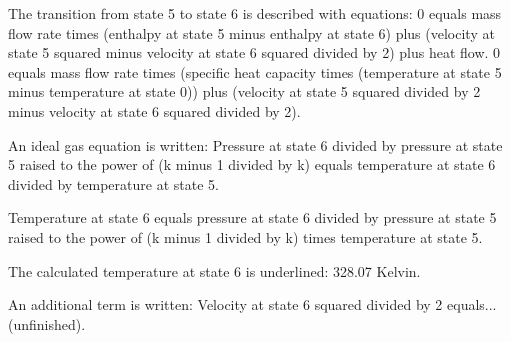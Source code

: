 The transition from state 5 to state 6 is described with equations:  
0 equals mass flow rate times (enthalpy at state 5 minus enthalpy at state 6) plus (velocity at state 5 squared minus velocity at state 6 squared divided by 2) plus heat flow.  
0 equals mass flow rate times (specific heat capacity times (temperature at state 5 minus temperature at state 0)) plus (velocity at state 5 squared divided by 2 minus velocity at state 6 squared divided by 2).  

An ideal gas equation is written:  
Pressure at state 6 divided by pressure at state 5 raised to the power of (k minus 1 divided by k) equals temperature at state 6 divided by temperature at state 5.  

Temperature at state 6 equals pressure at state 6 divided by pressure at state 5 raised to the power of (k minus 1 divided by k) times temperature at state 5.  

The calculated temperature at state 6 is underlined:  
328.07 Kelvin.  

An additional term is written:  
Velocity at state 6 squared divided by 2 equals... (unfinished).